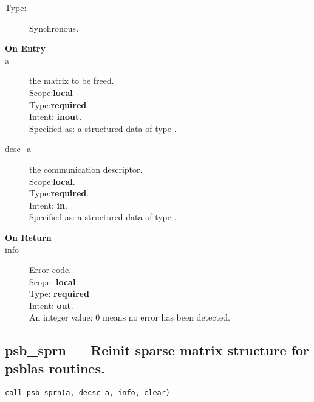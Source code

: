 \begin{description}
\item[Type:] Synchronous.
\item[\bf On Entry]
\item[a] the matrix to be freed.\\
Scope:{\bf local}\\
Type:{\bf required}\\
Intent: {\bf inout}.\\
Specified as: a structured data of type \spdata.
\item[desc\_a] the communication descriptor.\\
Scope:{\bf local}.\\
Type:{\bf required}.\\
Intent: {\bf in}.\\
Specified as: a structured data of type \descdata.
\end{description}

\begin{description}
\item[\bf On Return]
\item[info] Error code.\\
Scope: {\bf local} \\
Type: {\bf required} \\
Intent: {\bf out}.\\
An integer value; 0 means no error has been detected. 
\end{description}




%
%
\clearpage\subsection{psb\_sprn --- Reinit sparse matrix structure for psblas
  routines.}

\begin{verbatim}
call psb_sprn(a, decsc_a, info, clear)
\end{verbatim}

